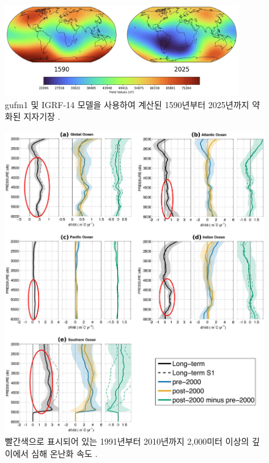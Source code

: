 \documentclass[10pt,twocolumn,letterpaper]{article}
\begin{document}
\begin{figure}[t]
\begin{center}
\includegraphics[width=0.9\textwidth]{saa.jpg}
\end{center}
   \caption{gufm1 및 IGRF-14 모델을 사용하여 계산된 1590년부터 2025년까지 약화된 지자기장 \cite{125,126}.}
\label{fig:14}
\end{figure}

\begin{figure}[t]
\begin{center}
   \includegraphics[width=1\linewidth]{ocean-highlight.jpg}
\end{center}
   \caption{빨간색으로 표시되어 있는 1991년부터 2010년까지 2,000미터 이상의 깊이에서 심해 온난화 속도 \cite{132}.}
\label{fig:15}
\label{fig:onecol}
\end{figure}
\end{document}
